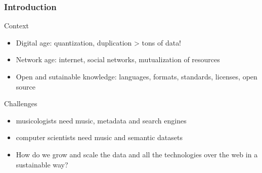 \documentclass[final, hyperref, table]{beamer}
\begin{document}
\begin{frame}\frametitle{Introduction}
 \begin{block}{Context}
   \begin{itemize}
    \item \alert{Digital age}: quantization, duplication > tons of data!
    \item \alert{Network age}: internet, social networks, mutualization of resources
    \item \alert{Open and sutainable knowledge}: languages, formats, standards, licenses, open source
   \end{itemize}
\end{block}

\begin{block}{Challenges}
   \begin{itemize}
    \item \alert{musicologists} need music, metadata and search engines
    \item \alert{computer scientists} need music and semantic datasets
    \item How do we grow and scale the data and all the technologies over the web in a sustainable way?
   \end{itemize}
\end{block}



\end{frame}
\end{document}
